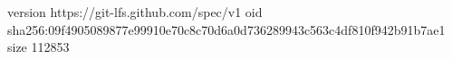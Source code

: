 version https://git-lfs.github.com/spec/v1
oid sha256:09f4905089877e99910e70c8c70d6a0d736289943c563c4df810f942b91b7ae1
size 112853
